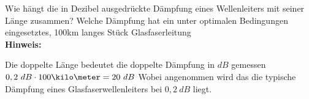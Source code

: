 \begin{question}[section=1,name={Strom und Spannungsverteilung},difficulty=,quantity=1,type=thr,tags={}]
	Wie hängt die in Dezibel ausgedrückte Dämpfung eines Wellenleiters mit seiner Länge zusammen? Welche Dämpfung hat ein unter optimalen Bedingungen eingesetztes, 100km langes Stück Glasfaserleitung
	\\ \textbf{Hinweis:}\\
	
\end{question}
\begin{solution}
	Die doppelte Länge bedeutet die doppelte Dämpfung in $dB$ gemessen \\
	$ 0,2~dB\cdot100\kilo\meter=20~dB $
	Wobei angenommen wird das die typische Dämpfung eines Glasfaserwellenleiters bei  $ 0,2 ~dB$ liegt.
\end{solution}